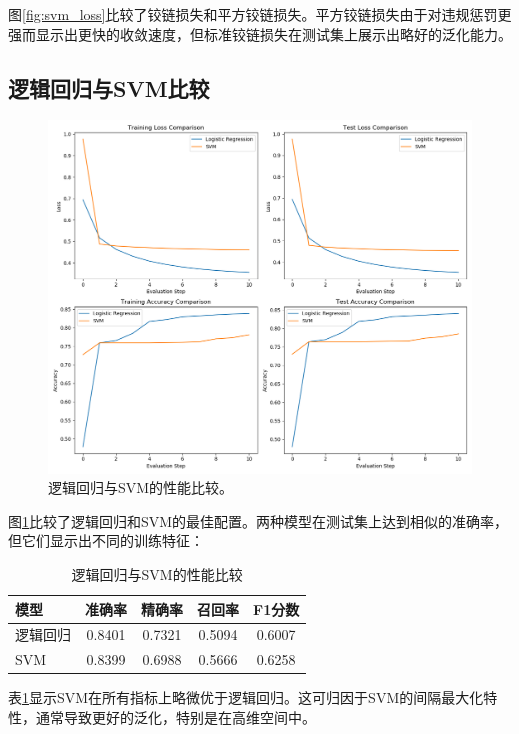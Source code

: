 \documentclass[journal, a4paper]{IEEEtran}
\begin{document}
\begin{CJK}{UTF8}{gbsn}
图\ref{fig:svm_loss}比较了铰链损失和平方铰链损失。平方铰链损失由于对违规惩罚更强而显示出更快的收敛速度，但标准铰链损失在测试集上展示出略好的泛化能力。

\subsection{逻辑回归与SVM比较}

\begin{figure}[htbp]
\centering
\includegraphics[width=\linewidth]{lr_vs_svm_comparison.png}
\caption{逻辑回归与SVM的性能比较。}
\label{fig:lr_vs_svm}
\end{figure}

图\ref{fig:lr_vs_svm}比较了逻辑回归和SVM的最佳配置。两种模型在测试集上达到相似的准确率，但它们显示出不同的训练特征：

\begin{table}[htbp]
\centering
\caption{逻辑回归与SVM的性能比较}
\label{tab:comparison}
\begin{tabular}{lcccc}
\toprule
\textbf{模型} & \textbf{准确率} & \textbf{精确率} & \textbf{召回率} & \textbf{F1分数} \\
\midrule
逻辑回归 & 0.8401 & 0.7321 & 0.5094 & 0.6007 \\
SVM & 0.8399 & 0.6988 & 0.5666 & 0.6258 \\
\bottomrule
\end{tabular}
\end{table}

表\ref{tab:comparison}显示SVM在所有指标上略微优于逻辑回归。这可归因于SVM的间隔最大化特性，通常导致更好的泛化，特别是在高维空间中。


\end{CJK}
\end{document}
